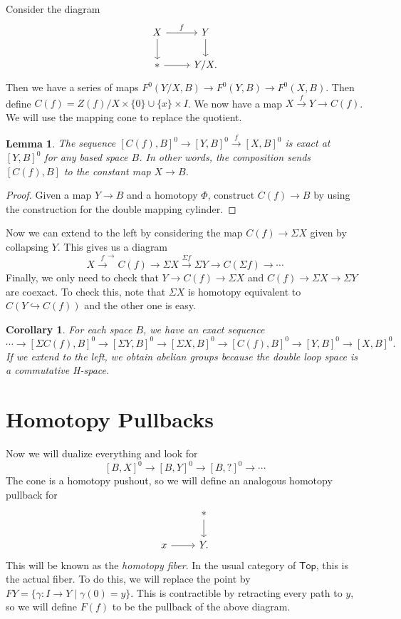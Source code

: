 \documentclass[leqno, openany]{memoir}
\newtheorem{cor}[thm]{Corollary}
\newtheorem{lem}[thm]{Lemma}
\theoremstyle{definition}
\theoremstyle{remark}
\theoremstyle{plain}
\theoremstyle{definition}
\theoremstyle{remark}
\newcommand{\ms}[1]{\mathsf{#1}}
\begin{document}
Consider the diagram
\begin{equation}
\begin{tikzcd}
    X \arrow{r}{f} \arrow{d} & Y \arrow{d} \\
    * \arrow{r} & Y/X.
\end{tikzcd}
\end{equation}
Then we have a series of maps $F^0(Y/X,B) \to F^0(Y,B) \to F^0(X,B)$. Then define $C(f) = Z(f) / X \times \{0 \} \cup \{x\} \times I$. We now have a map $X \xrightarrow{f} Y \to C(f)$. We will use the mapping cone to replace the quotient.

\begin{lem}
    The sequence $[C(f),B]^0 \to [Y,B]^0 \xrightarrow{f} [X,B]^0$ is exact at $[Y,B]^0$ for any based space $B$. In other words, the composition sends $[C(f),B]$ to the constant map $X \to B$.
\end{lem}

\begin{proof}
    Given a map $Y \to B$ and a homotopy $\Phi$, construct $C(f) \to B$ by using the construction for the double mapping cylinder.
\end{proof}

Now we can extend to the left by considering the map $C(f) \to \Sigma X$ given by collapsing $Y$. This gives us a diagram
\[ X \xrightarrow{f} ^ \to C(f) \to \Sigma X \xrightarrow{\Sigma f} \Sigma Y \to C(\Sigma f) \to \cdots \]
Finally, we only need to check that $Y \to C(f) \to \Sigma X$ and $C(f) \to \Sigma X \to \Sigma Y$ are coexact. To check this, note that $\Sigma X$ is homotopy equivalent to $C(Y \hookrightarrow C(f))$ and the other one is easy.

\begin{cor}
    For each space $B$, we have an exact sequence
    \[ \cdots \to [\Sigma C(f),B]^0 \to [\Sigma Y, B]^0 \to [\Sigma X,B]^0 \to [C(f),B]^0 \to [Y,B]^0 \to [X,B]^0. \]
    If we extend to the left, we obtain \textit{abelian groups} because the double loop space is a commutative H-space. 
\end{cor}

\section{Homotopy Pullbacks}%
\label{sec:homotopy_pullbacks}

Now we will dualize everything and look for
\[ [B,X]^0 \to [B,Y]^0 \to [B,?]^0 \to \cdots \]
The cone is a homotopy pushout, so we will define an analogous homotopy pullback for
\begin{equation}
\begin{tikzcd}
    & * \arrow{d} \\
    x \arrow{r} & Y.
\end{tikzcd}
\end{equation}
This will be known as the \textit{homotopy fiber}. In the usual category of $\ms{Top}$, this is the actual fiber. To do this, we will replace the point by $F Y = \{ \gamma: I \to Y \mid \gamma(0) = y \}$. This is contractible by retracting every path to $y$, so we will define $F(f)$ to be the pullback of the above diagram.
\end{document}
